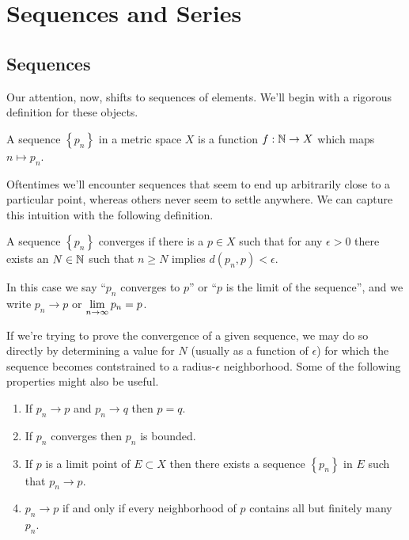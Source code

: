\documentclass[../m131main.tex]{subfiles}
\begin{document}
\chapter{Sequences and Series}
\section{Sequences}
Our attention, now, shifts to sequences of elements.
We'll begin with a rigorous definition for these objects.

\begin{definition}[Sequence]
    A sequence $\left\{ p_n \right\}$ in a metric space $X$ is a function $f : \mathbb{N} \to X$ which maps $n \mapsto p_n$.
\end{definition}

Oftentimes we'll encounter sequences that seem to end up arbitrarily close to a particular point, whereas others never seem to settle anywhere.
We can capture this intuition with the following definition.

\begin{definition}[Convergence]
    A sequence $\left\{ p_n \right\}$ converges if there is a $p \in X$ such that for any $\epsilon > 0$ there exists an $N \in \mathbb{N}$ such that $n \geq N$ implies $d(p_n, p) < \epsilon$.
\end{definition}

In this case we say ``$p_n$ converges to $p$'' or ``$p$ is the limit of the sequence'', and we write $p_n \to p$ or $\displaystyle \lim_{n \to \infty} p_n = p$.

\vspace{-3pt}
If we're trying to prove the convergence of a given sequence, we may do so directly by determining a value for $N$ (usually as a function of $\epsilon$) for which the sequence becomes contstrained to a radius-$\epsilon$ neighborhood.
Some of the following properties might also be useful.

\begin{theorem}
    \begin{enumerate}[label=(\alph*)]
        \item If $p_n \to p$ and $p_n \to q$ then $p = q$.
        \item If $p_n$ converges then $p_n$ is bounded.
        \item If $p$ is a limit point of $E \subset X$ then there exists a sequence $\left\{ p_n \right\}$ in $E$ such that $p_n \to p$.
        \item $p_n \to p$ if and only if every neighborhood of $p$ contains all but finitely many $p_n$.
    \end{enumerate}
\end{theorem}
\end{document}
